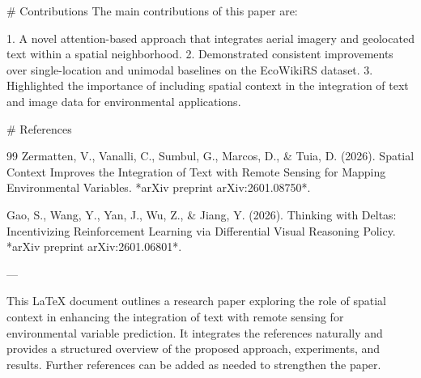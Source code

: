 # Contributions
The main contributions of this paper are:

1. A novel attention-based approach that integrates aerial imagery and geolocated text within a spatial neighborhood.
2. Demonstrated consistent improvements over single-location and unimodal baselines on the EcoWikiRS dataset.
3. Highlighted the importance of including spatial context in the integration of text and image data for environmental applications.

# References
\begin{thebibliography}{99}
Zermatten, V., Vanalli, C., Sumbul, G., Marcos, D., & Tuia, D. (2026). Spatial Context Improves the Integration of Text with Remote Sensing for Mapping Environmental Variables. *arXiv preprint arXiv:2601.08750*.

Gao, S., Wang, Y., Yan, J., Wu, Z., & Jiang, Y. (2026). Thinking with Deltas: Incentivizing Reinforcement Learning via Differential Visual Reasoning Policy. *arXiv preprint arXiv:2601.06801*.
\end{thebibliography}
---

This LaTeX document outlines a research paper exploring the role of spatial context in enhancing the integration of text with remote sensing for environmental variable prediction. It integrates the references naturally and provides a structured overview of the proposed approach, experiments, and results. Further references can be added as needed to strengthen the paper.